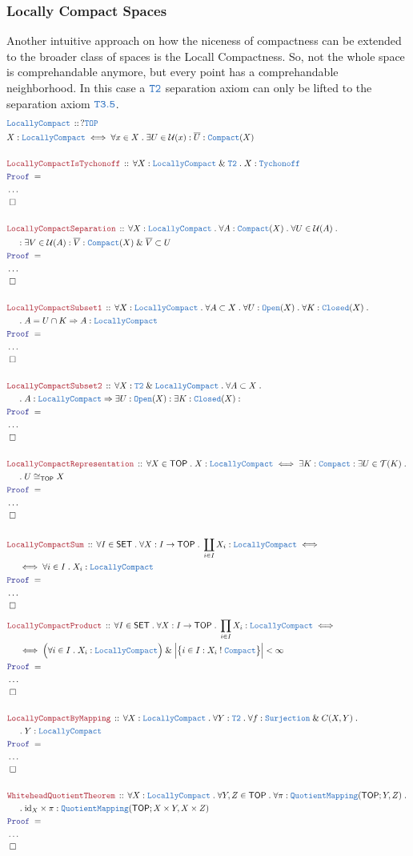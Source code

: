 \documentclass[12pt]{scrartcl}
\newcommand{\TYPE}[1]{\textcolor{NavyBlue}{\mathtt{#1}}}
\newcommand{\LOGIC}[1]{\textcolor{Blue}{\mathtt{#1}}}
\newcommand{\THM}[1]{\textcolor{Maroon}{\mathtt{#1}}}
\renewcommand{\.}{\; . \;}
\newcommand{\IsNot}{\; ! \;}
\newcommand{\Theorem}[2]{& \THM{#1} \, :: \, #2 \\ & \Proof = \\ }
\newcommand{\DeclareType}[2]{& \TYPE{#1} \, :: \, #2 \\}
\newcommand{\DefineType}[3]{& #1 : \TYPE{#2} \iff #3 \\}
\newcommand{\NewLine}{\\ & \kern 1pc}
\newcommand{\Page}[1]{ \begin{align*} #1 \end{align*}   }
\newcommand{\NoProof}{ & \ldots \\ \EndProof}
\renewcommand{\And}{\; \& \;}
\newcommand{\Imply}{\Rightarrow}
\DeclareMathOperator*{\id}{id}
\newcommand{\QED}{\; \square}
\newcommand{\EndProof}{& \QED \\}
\newcommand{\Proof}{\LOGIC{Proof} \; }
\newcommand{\SET}{\mathsf{SET}}
\newcommand{\TOP}{\mathsf{TOP}}
\newcommand{\T}{\mathcal{T}}
\renewcommand{\U}{\mathcal{U}}
\begin{document}
\subsubsection{Locally Compact Spaces}
Another intuitive approach on how the niceness of compactness can be extended to the broader class of
spaces is the Locall Compactness. So, not the whole space is comprehandable anymore, but every point has a comprehandable neighborhood. In this case a $\TYPE{T2}$ separation axiom can only be lifted to the separation axiom $\TYPE{T3.5}$. 
\Page{
	\DeclareType{LocallyCompact}{?\TYPE{TOP}}
	\DefineType{X}{LocallyCompact}{\forall x \in X \. \exists U \in \U(x) : \overline{U} : \TYPE{Compact}(X) }
	\\
	\Theorem{LocallyCompactIsTychonoff}{\forall X : \TYPE{LocallyCompact} \And \TYPE{T2} \. X : \TYPE{Tychonoff} }
	\NoProof
	\\
	\Theorem{LocallyCompactSeparation}
	{
		\forall X : \TYPE{LocallyCompact} \.
		\forall A : \TYPE{Compact}(X) \.
		\forall U \in \U(A) \. \NewLine : 
		\exists V \in \U(A) : 
		\overline{V} : \TYPE{Compact}(X) \And \overline{V} \subset U
	}
	\NoProof
	\\
	\Theorem{LocallyCompactSubset1}
	{
		\forall X : \TYPE{LocallyCompact} \.
		\forall A \subset X \.
		\forall U : \TYPE{Open}(X) \.
		\forall K : \TYPE{Closed}(X) \. \NewLine \. 
		A = U \cap K \Imply  A : \TYPE{LocallyCompact}
	}
	\NoProof
	\\
	\Theorem{LocallyCompactSubset2}
	{
		\forall X : \TYPE{T2} \And \TYPE{LocallyCompact} \.
		\forall A \subset X \. \NewLine \.
		A : \TYPE{LocallyCompact} \Imply \exists U : \TYPE{Open}(X) :
		\exists K : \TYPE{Closed}(X) :
	}
	\NoProof
	\\
	\Theorem{LocallyCompactRepresentation}
	{
		\forall X  \in \TOP \.
		X : \TYPE{LocallyCompact} \iff \exists K : \TYPE{Compact} : \exists U \in \T(K) \. 
		\NewLine \.
		U \cong_{\TOP} X
	}
	\NoProof
	\\
	\Theorem{LocallyCompactSum}
	{
		\forall I \in \SET \. \forall X : I \to \TOP \. 
		\coprod_{i\in I} X_i : \TYPE{LocallyCompact} \iff \NewLine \iff 
		\forall i \in I \. X_i : \TYPE{LocallyCompact}
	}
	\NoProof
}\Page{
	\Theorem{LocallyCompactProduct}
	{
		\forall I \in \SET \. \forall X : I \to \TOP \. 
		\prod_{i\in I} X_i : \TYPE{LocallyCompact} \iff \NewLine \iff 
		\Big(\forall i \in I \. X_i : \TYPE{LocallyCompact} \Big)
		\And  \Big|\big\{ i \in I : X_i \IsNot \TYPE{Compact}  \big\}\Big| < \infty
	}
	\NoProof
	\\
	\Theorem{LocallyCompactByMapping}
	{
		\forall X : \TYPE{LocallyCompact} \.
		\forall Y : \TYPE{T2} \.
		\forall f : \TYPE{Surjection} \And C(X,Y) \. \NewLine \.
		Y : \TYPE{LocallyCompact}
	}
	\NoProof
	\\
	\Theorem{WhiteheadQuotientTheorem}
	{
		\forall X : \TYPE{LocallyCompact} \.
		\forall Y,Z \in \TOP \.
		\forall \pi : \TYPE{QuotientMapping}(\TOP;Y,Z) \. \NewLine \. 
		{\id}_X \times \pi : \TYPE{QuotientMapping}(\TOP;X \times Y,X \times Z)
	}
	\NoProof
}
\newpage
\end{document}

